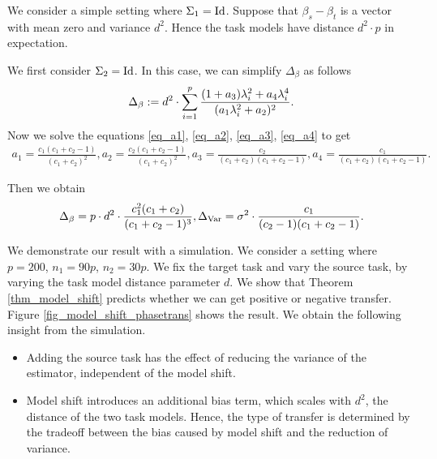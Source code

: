 \begin{example}
	We consider a simple setting where $\Sigma_1 = \operatorname{Id}$.
	Suppose that $\beta_s - \beta_t$ is a vector with mean zero and variance $d^2$. Hence the task models have distance $d^2\cdot p$ in expectation.

	We first consider $\Sigma_2 = \operatorname{Id}$. In this case, we can simplify $\Delta_{\beta}$ as follows
	\begin{align} \label{eq_delta_simple}
		\Delta_{\beta} := d^2 \cdot \sum_{i=1}^p \frac{(1 + a_3)\lambda_i^2 + a_4 \lambda_i^4}{(a_1 \lambda_i^2 + a_2)^2}.
	\end{align}
	Now we solve the equations \eqref{eq_a1}, \eqref{eq_a2}, \eqref{eq_a3}, \eqref{eq_a4} to get
	\begin{align}
		a_1 = \frac{c_1(c_1 + c_2 - 1)}{(c_1 + c_2)^2},
		a_2 = \frac{c_2(c_1 + c_2 - 1)}{(c_1 + c_2)^2},
		a_3 = \frac{c_2}{(c_1 + c_2)(c_1 + c_2 - 1)},
		a_4 = \frac{c_1}{(c_1 + c_2)(c_1 + c_2 - 1)}.
	\end{align}
	
	Then we obtain
	\begin{align}
		\Delta_{\beta} = p \cdot d^2 \cdot \frac{c_1^2 (c_1 + c_2)}{(c_1 + c_2 - 1)^3},
		\Delta_{\operatorname{Var}} = \sigma^2 \cdot \frac{c_1}{(c_2 - 1)(c_1 + c_2 - 1)}.
	\end{align}

	We demonstrate our result with a simulation.
	We consider a setting where $p = 200$, $n_1 = 90p$, $n_2 = 30p$.
	We fix the target task and vary the source task, by varying the task model distance parameter $d$.
	We show that Theorem \ref{thm_model_shift} predicts whether we can get positive or negative transfer.
	Figure \ref{fig_model_shift_phasetrans} shows the result.
	We obtain the following insight from the simulation.
	\begin{itemize}
		\item Adding the source task has the effect of reducing the variance of the estimator, independent of the model shift.
		\item Model shift introduces an additional bias term, which scales with $d^2$, the distance of the two task models.
		Hence, the type of transfer is determined by the tradeoff between the bias caused by model shift and the reduction of variance.
	\end{itemize}
\end{example}

